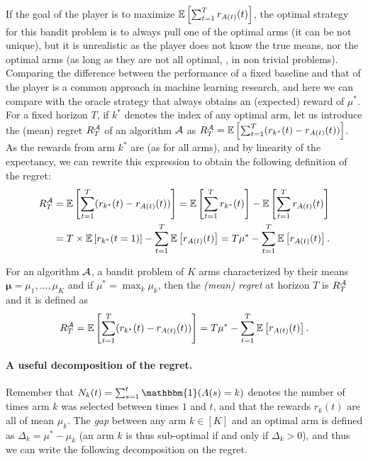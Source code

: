 If the goal of the player is to maximize $\mathbb{E}\left[\sum_{t=1}^T r_{A(t)}(t)\right]$,
the optimal strategy for this bandit problem is to always pull one of the optimal arms (it can be not unique), but it is unrealistic as the player does not know the true means, nor the optimal arms (as long as they are not all optimal, \ie, in non trivial problems).
%
Comparing the difference between the performance of a fixed baseline and that of the player is a common approach in machine learning research,
and here we can compare with the oracle strategy that always obtains an (expected) reward of $\mu^*$.
%
For a fixed horizon $T$, if $k^*$ denotes the index of any optimal arm,
let us introduce the (mean) regret $R_T^{\mathcal{A}}$ of an algorithm $\mathcal{A}$ as
$R_T^{\mathcal{A}} = \mathbb{E}\left[ \sum_{t=1}^T (r_{k^*}(t) - r_{A(t)}(t)) \right]$.
%
As the rewards from arm $k^*$ are \iid{} (as for all arms), and by linearity of the expectancy, we can rewrite this expression to obtain the following definition of the regret:
\begin{align*}
    R_T^{\mathcal{A}}
    & = \mathbb{E}\left[ \sum_{t=1}^T (r_{k^*}(t) - r_{A(t)}(t)) \right]
    = \mathbb{E}\left[ \sum_{t=1}^T r_{k^*}(t) \right] - \mathbb{E}\left[ \sum_{t=1}^T r_{A(t)}(t) \right] \\
    & = T \times \mathbb{E}\left[ r_{k^*}(t=1) \right] - \sum_{t=1}^T \mathbb{E}\left[ r_{A(t)}(t) \right]
    = T \mu^* - \sum_{t=1}^T \mathbb{E}\left[ r_{A(t)}(t) \right].
\end{align*}


\begin{defn}[Regret]\label{def:2:regret}
    For an algorithm $\mathcal{A}$, a bandit problem of $K$ arms characterized by their means $\bm{\mu} = \mu_1,\dots,\mu_K$ and if $\mu^* = \max_k \mu_k$, then the \emph{(mean) regret} at horizon $T$ is $R_T^{\mathcal{A}}$ and it is defined as
    \begin{equation}
        R_T^{\mathcal{A}}
        = \mathbb{E}\left[ \sum_{t=1}^T (r_{k^*}(t) - r_{A(t)}(t)) \right]
        = T \mu^* - \sum_{t=1}^T \mathbb{E}\left[ r_{A(t)}(t) \right].
    \end{equation}
\end{defn}


\paragraph{A useful decomposition of the regret.}
%
Remember that $N_k(t) = \sum_{s=1}^t \mathbbm{1}(A(s) = k)$ denotes the number of times arm $k$ was selected between times $1$ and $t$,
%
and that the rewards $r_k(t)$ are all \iid{} of mean $\mu_k$.
The \emph{gap} between any arm $k\in[K]$ and an optimal arm is defined as $\Delta_k = \mu^* - \mu_k$
(an arm $k$ is thus sub-optimal if and only if $\Delta_k > 0$),
and thus we can write the following decomposition on the regret.

